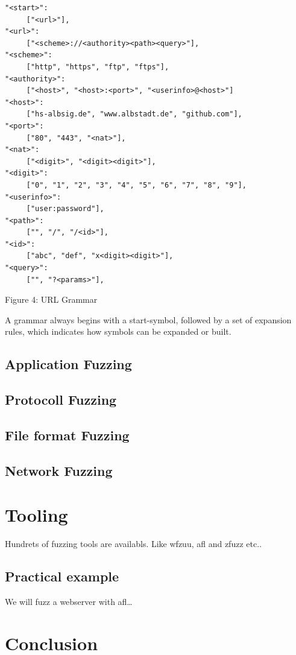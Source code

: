 \documentclass[journal=tosc,final]{iacrtrans}
\begin{document}
\begin{center}
\begin{shaded}
\begin{internallinenumbers}
\begin{verbatim}
"<start>":
     ["<url>"],
"<url>":
     ["<scheme>://<authority><path><query>"],
"<scheme>":
     ["http", "https", "ftp", "ftps"],
"<authority>":
     ["<host>", "<host>:<port>", "<userinfo>@<host>"]
"<host>":  
     ["hs-albsig.de", "www.albstadt.de", "github.com"],
"<port>":
     ["80", "443", "<nat>"],
"<nat>":
     ["<digit>", "<digit><digit>"],
"<digit>":
     ["0", "1", "2", "3", "4", "5", "6", "7", "8", "9"],
"<userinfo>":  
     ["user:password"],
"<path>":  
     ["", "/", "/<id>"],
"<id>":  
     ["abc", "def", "x<digit><digit>"],
"<query>":
     ["", "?<params>"],
\end{verbatim}
\end{internallinenumbers}
\vspace{2mm} Figure 4: URL Grammar
\end{shaded}
\end{center}
A grammar always begins with a start-symbol, followed by a set of expansion rules, which indicates how symbols can be expanded or built.
\newpage
\subsection{Application Fuzzing}
\subsection{Protocoll Fuzzing}
\subsection{File format Fuzzing}
\subsection{Network Fuzzing}
\newpage
\section{Tooling}
Hundrets of fuzzing tools are availabls. Like wfzuu, afl and zfuzz etc..
\subsection{Practical example}
We will fuzz a webserver with afl\dots
\section{Conclusion}
\end{document}
